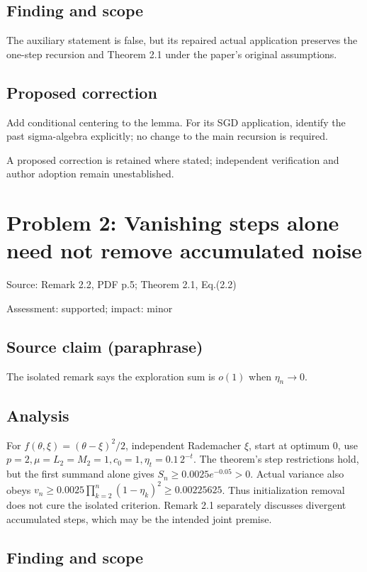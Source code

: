 \documentclass[11pt]{article}
\begin{document}
\subsection*{Finding and scope}

The auxiliary statement is false, but its repaired actual application preserves the one-step recursion and Theorem 2.1 under the paper’s original assumptions.

\subsection*{Proposed correction}

Add conditional centering to the lemma. For its SGD application, identify the past sigma-algebra explicitly; no change to the main recursion is required.

A proposed correction is retained where stated; independent verification and author adoption remain unestablished.

\section*{Problem 2: Vanishing steps alone need not remove accumulated noise}

Source: Remark 2.2, PDF p.5; Theorem 2.1, Eq.(2.2)

Assessment: supported; impact: minor

\subsection*{Source claim (paraphrase)}

The isolated remark says the exploration sum is \(o(1)\) when \(\eta_n\to0\).

\subsection*{Analysis}

For \(f(\theta,\xi)=(\theta-\xi)^2/2\), independent Rademacher \(\xi\), start at optimum \(0\), use \(p=2,\mu=L_2=M_2=1,c_0=1,\eta_t=0.1\,2^{-t}\). The theorem’s step restrictions hold, but the first summand alone gives \(S_n\ge0.0025e^{-0.05}>0\). Actual variance also obeys \(v_n\ge0.0025\prod_{k=2}^n(1-\eta_k)^2\ge0.00225625\). Thus initialization removal does not cure the isolated criterion. Remark 2.1 separately discusses divergent accumulated steps, which may be the intended joint premise.

\subsection*{Finding and scope}
\end{document}
